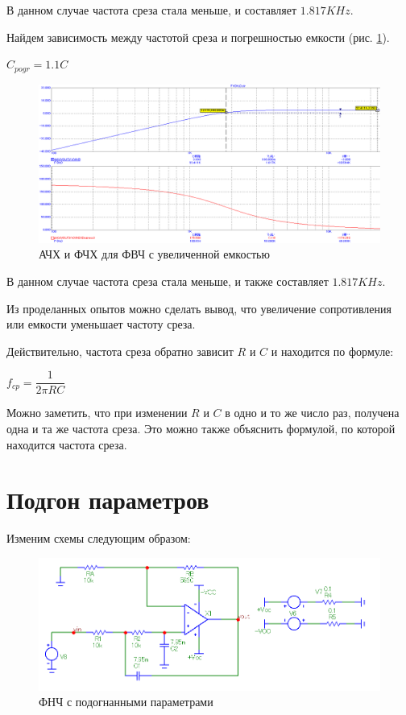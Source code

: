 \documentclass[a4paper,14pt]{article}
\begin{document}
В данном случае частота среза стала меньше, и составляет $1.817KHz$.

Найдем зависимость между частотой среза и погрешностью емкости (рис. \ref{fig:pogrcv}). 

$C_{pogr} = 1.1C$

\begin{figure}[H]
	\centering
	\includegraphics[width=0.85\linewidth]{../imgs/FVCH/pogr_C_V}
	\caption{АЧХ и ФЧХ для ФВЧ с увеличенной емкостью}
	\label{fig:pogrcv}
\end{figure}

В данном случае частота среза стала меньше, и также составляет $1.817KHz$.

Из проделанных опытов можно сделать вывод, что увеличение сопротивления или емкости уменьшает частоту среза.

Действительно, частота среза обратно зависит $R$ и $C$ и находится по формуле:

$f_{cp} = \dfrac{1}{2\pi RC}$

Можно заметить, что при изменении $R$ и $C$ в одно и то же число раз, получена одна и та же частота среза.
Это можно также объяснить формулой, по которой находится частота среза.

\section{Подгон параметров}

Изменим схемы следующим образом:

\begin{figure}[H]
	\centering
	\includegraphics[width=0.85\linewidth]{../imgs/FNCH/sh_fnch_p}
	\caption{ФНЧ с подогнанными параметрами}
	\label{fig:shfnchp}
\end{figure}
\end{document}

